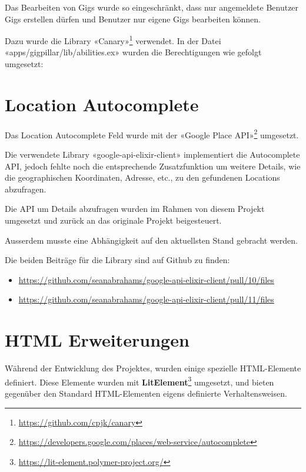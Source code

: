 Das Bearbeiten von Gigs wurde so eingeschränkt, dass nur angemeldete Benutzer Gigs erstellen dürfen und Benutzer nur eigene Gigs bearbeiten können.

Dazu wurde die Library «Canary»\footnote{\url{https://github.com/cpjk/canary}} verwendet. In der Datei «apps/gigpillar/lib/abilities.ex» wurden die Berechtigungen wie gefolgt umgesetzt:



\clearpage
\section{Location Autocomplete}

Das Location Autocomplete Feld wurde mit der «Google Place API»\footnote{\url{https://developers.google.com/places/web-service/autocomplete}} umgesetzt.

Die verwendete Library «google-api-elixir-client» implementiert die
Autocomplete API, jedoch fehlte noch die entsprechende Zusatzfunktion um
weitere Details, wie die geographischen Koordinaten, Adresse, etc., zu den gefundenen Locations abzufragen.

Die API um Details abzufragen wurden im Rahmen von diesem Projekt umgesetzt
und zurück an das originale Projekt beigesteuert.

Ausserdem musste eine Abhängigkeit auf den aktuellsten Stand gebracht werden.

Die beiden Beiträge für die Library sind auf Github zu finden:

\begin{itemize}
  \item{} \url{https://github.com/seanabrahams/google-api-elixir-client/pull/10/files}
  \item{} \url{https://github.com/seanabrahams/google-api-elixir-client/pull/11/files}
\end{itemize}

\clearpage
\section{HTML Erweiterungen}

Während der Entwicklung des Projektes, wurden einige spezielle HTML-Elemente
definiert. Diese Elemente wurden mit \textbf{LitElement}\footnote{\url{https://lit-element.polymer-project.org/}}
umgesetzt, und bieten gegenüber den Standard HTML-Elementen eigens definierte
Verhaltensweisen.

